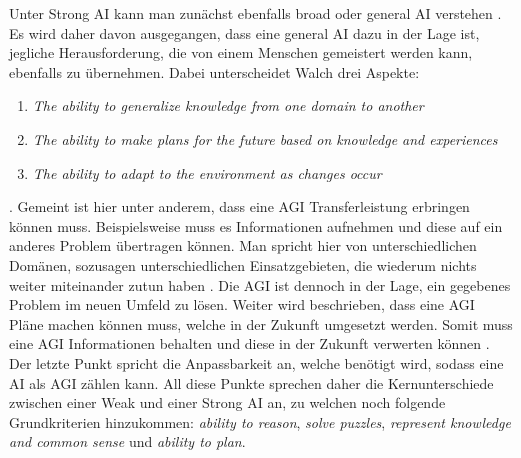             Unter Strong AI kann man zunächst ebenfalls broad oder general AI verstehen \cite{walch_world_2019}. Es wird
            daher davon ausgegangen, dass eine general AI dazu in der Lage ist, jegliche Herausforderung, die von einem
            Menschen gemeistert werden kann, ebenfalls zu übernehmen. Dabei unterscheidet Walch drei Aspekte:
            \begin{enumerate}
                \item \textit{The ability to generalize knowledge from one domain to another}
                \item \textit{The ability to make plans for the future based on knowledge and experiences}
                \item \textit{The ability to adapt to the environment as changes occur}
            \end{enumerate}
            \cite{walch_world_2019}.
            Gemeint ist hier unter anderem, dass eine AGI Transferleistung erbringen können muss. Beispielsweise muss
            es Informationen aufnehmen und diese auf ein anderes Problem übertragen können. Man spricht hier von
            unterschiedlichen Domänen, sozusagen unterschiedlichen Einsatzgebieten, die wiederum nichts weiter miteinander
            zutun haben \cite{walch_world_2019}. Die AGI ist dennoch in der Lage, ein gegebenes Problem im neuen Umfeld
            zu lösen. Weiter wird beschrieben, dass eine AGI Pläne machen können muss, welche in der Zukunft umgesetzt
            werden. Somit muss eine AGI Informationen behalten und diese in der Zukunft verwerten können \cite{walch_world_2019}.
            Der letzte Punkt spricht die Anpassbarkeit an, welche benötigt wird, sodass eine AI als AGI zählen kann.
            All diese Punkte sprechen daher die Kernunterschiede zwischen einer Weak und einer Strong AI an, zu welchen
            noch folgende Grundkriterien hinzukommen: \textit{ability to reason}, \textit{solve puzzles},
            \textit{represent knowledge and common sense} und \textit{ability to plan}.

